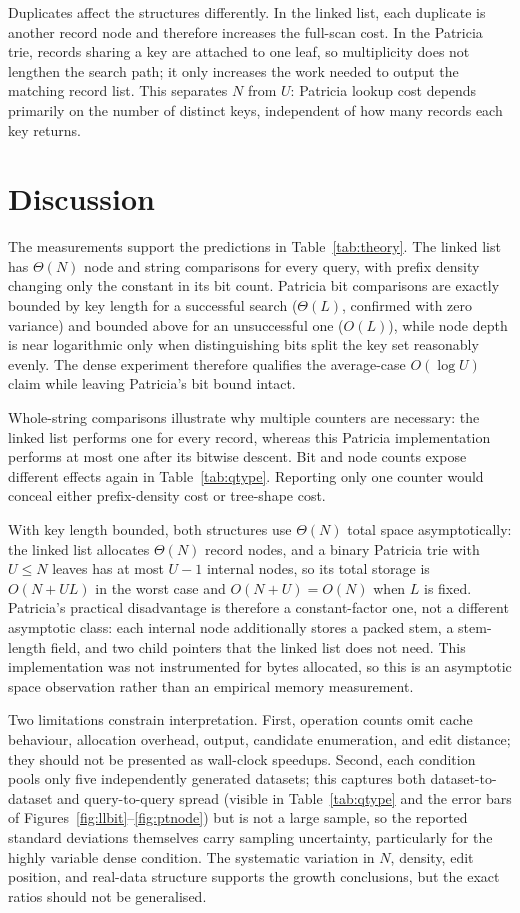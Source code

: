 \documentclass[10pt]{article}
\begin{document}
Duplicates affect the structures differently. In the linked list, each duplicate is
another record node and therefore increases the full-scan cost. In the Patricia trie,
records sharing a key are attached to one leaf, so multiplicity does not lengthen the
search path; it only increases the work needed to output the matching record list. This
separates $N$ from $U$: Patricia lookup cost depends primarily on the number of distinct
keys, independent of how many records each key returns.

\section{Discussion}

The measurements support the predictions in Table~\ref{tab:theory}. The linked list has
$\Theta(N)$ node and string comparisons for every query, with prefix density changing only
the constant in its bit count. Patricia bit comparisons are exactly bounded by key length
for a successful search ($\Theta(L)$, confirmed with zero variance) and bounded above for
an unsuccessful one ($O(L)$), while node depth is near logarithmic only when
distinguishing bits split the key set reasonably evenly. The dense experiment therefore
qualifies the average-case $O(\log U)$ claim while leaving Patricia's bit bound intact.

Whole-string comparisons illustrate why multiple counters are necessary: the linked list
performs one for every record, whereas this Patricia implementation performs at most one
after its bitwise descent. Bit and node counts expose different effects again in
Table~\ref{tab:qtype}. Reporting only one counter would conceal either prefix-density cost or
tree-shape cost.

With key length bounded, both structures use $\Theta(N)$ total space asymptotically: the
linked list allocates $\Theta(N)$ record nodes, and a binary Patricia trie with $U \le N$
leaves has at most $U-1$ internal nodes, so its total storage is $O(N+UL)$ in the worst
case and $O(N+U)=O(N)$ when $L$ is fixed. Patricia's practical disadvantage is therefore a
constant-factor one, not a different asymptotic class: each internal node additionally
stores a packed stem, a stem-length field, and two child pointers that the linked list
does not need. This implementation was not instrumented for bytes allocated, so this is
an asymptotic space observation rather than an empirical memory measurement.

Two limitations constrain interpretation. First, operation counts omit cache behaviour,
allocation overhead, output, candidate enumeration, and edit distance; they should not be
presented as wall-clock speedups. Second, each condition pools only five independently
generated datasets; this captures both dataset-to-dataset and query-to-query spread
(visible in Table~\ref{tab:qtype} and the error bars of Figures~\ref{fig:llbit}--\ref{fig:ptnode})
but is not a large sample, so the reported standard deviations themselves carry sampling
uncertainty, particularly for the highly variable dense condition. The systematic
variation in $N$, density, edit position, and real-data structure supports the growth
conclusions, but the exact ratios should not be generalised.
\end{document}
